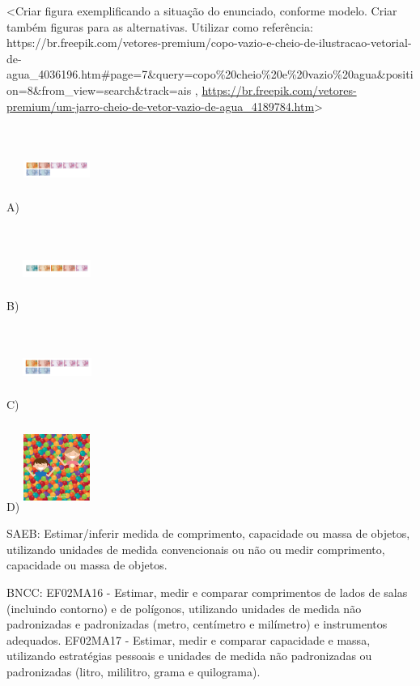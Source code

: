 \begin{escolha}
\begin{escolha}
{{{{\textless{}Criar figura exemplificando a situação do enunciado, conforme
modelo. Criar também figuras para as alternativas. Utilizar como
referência:
https://br.freepik.com/vetores-premium/copo-vazio-e-cheio-de-ilustracao-vetorial-de-agua\_4036196.htm\#page=7\&query=copo\%20cheio\%20e\%20vazio\%20agua\&position=8\&from\_view=search\&track=ais
,
\url{https://br.freepik.com/vetores-premium/um-jarro-cheio-de-vetor-vazio-de-agua_4189784.htm}\textgreater{}

A)
\includegraphics[width=0.85660in,height=1.10720in]{media/image145.png}

B)
\includegraphics[width=0.87104in,height=1.07664in]{media/image146.png}

C)
\includegraphics[width=0.88672in,height=1.06792in]{media/image145.png}

D)
\includegraphics[width=0.86059in,height=1.12017in]{media/image147.png}

SAEB: Estimar/inferir medida de comprimento, capacidade ou massa
de objetos, utilizando unidades de medida convencionais ou não ou medir
comprimento, capacidade ou massa de objetos.

BNCC: EF02MA16 - Estimar, medir e comparar comprimentos de lados de
salas (incluindo contorno) e de polígonos, utilizando unidades de medida
não padronizadas e padronizadas (metro, centímetro e milímetro) e
instrumentos adequados. EF02MA17 - Estimar, medir e comparar capacidade
e massa, utilizando estratégias pessoais e unidades de medida não
padronizadas ou padronizadas (litro, mililitro, grama e quilograma).

}}}}
\end{escolha}
\end{escolha}

